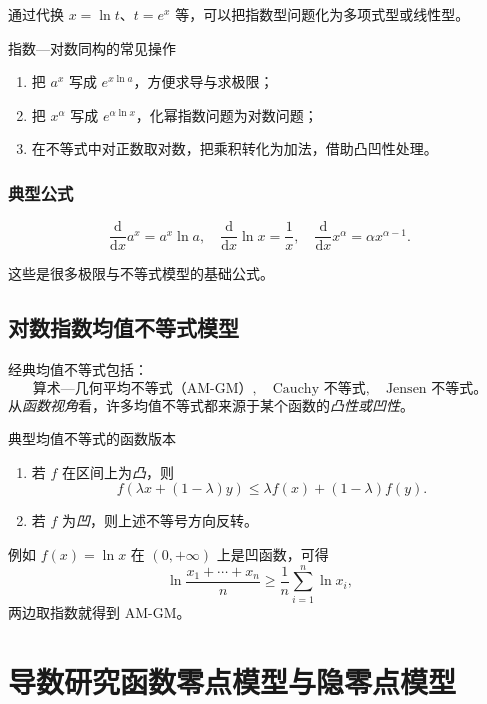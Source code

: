 \documentclass[a4paper,11pt]{ctexart}
\begin{document}
通过代换 $x=\ln t$、$t=e^x$ 等，可以把指数型问题化为多项式型或线性型。

\begin{conceptbox}{指数—对数同构的常见操作}
  \begin{enumerate}
    \item 把 $a^x$ 写成 $e^{x\ln a}$，方便求导与求极限；
    \item 把 $x^\alpha$ 写成 $e^{\alpha\ln x}$，化幂指数问题为对数问题；
    \item 在不等式中对正数取对数，把乘积转化为加法，借助凸凹性处理。
  \end{enumerate}
\end{conceptbox}

\subsubsection{典型公式}

\[
  \frac{\mathrm{d}}{\mathrm{d}x}a^x=a^x\ln a,\quad
  \frac{\mathrm{d}}{\mathrm{d}x}\ln x=\frac{1}{x},\quad
  \frac{\mathrm{d}}{\mathrm{d}x}x^{\alpha}=\alpha x^{\alpha-1}.
\]

这些是很多极限与不等式模型的基础公式。

\subsection{对数指数均值不等式模型}

经典均值不等式包括：
\[
  \text{算术—几何平均不等式（AM-GM）},\quad
  \text{Cauchy 不等式},\quad
  \text{Jensen 不等式}。
\]
从\emph{函数视角}看，许多均值不等式都来源于某个函数的\emph{凸性或凹性}。

\begin{definitionbox}{典型均值不等式的函数版本}
  \begin{enumerate}
    \item 若 $f$ 在区间上为\emph{凸}，则
      \[
        f(\lambda x+(1-\lambda)y)
        \le
        \lambda f(x)+(1-\lambda)f(y).
      \]
    \item 若 $f$ 为\emph{凹}，则上述不等号方向反转。
  \end{enumerate}
\end{definitionbox}

例如 $f(x)=\ln x$ 在 $(0,+\infty)$ 上是凹函数，可得
\[
  \ln\frac{x_1+\cdots+x_n}{n}
  \ge
  \frac{1}{n}\sum_{i=1}^n\ln x_i,
\]
两边取指数就得到 AM-GM。

\section{导数研究函数零点模型与隐零点模型}
\end{document}
